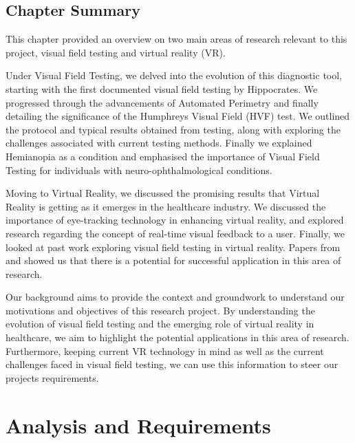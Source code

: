 \documentclass{l4proj}
\begin{document}
\section{Chapter Summary}
This chapter provided an overview on two main areas of research relevant to this project, visual field testing and virtual reality (VR).

Under Visual Field Testing, we delved into the evolution of this diagnostic tool, starting with the first documented visual field testing by Hippocrates. We progressed through the advancements of Automated Perimetry and finally detailing the significance of the Humphreys Visual Field (HVF) test. We outlined the protocol and typical results obtained from testing, along with exploring the challenges associated with current testing methods. Finally we explained Hemianopia as a condition and emphasised the importance of Visual Field Testing for individuals with neuro-ophthalmological conditions.

Moving to Virtual Reality, we discussed the promising results that Virtual Reality is getting as it emerges in the healthcare industry. We discussed the importance of eye-tracking technology in enhancing virtual reality, and explored research regarding the concept of real-time visual feedback to a user. Finally, we looked at past work exploring visual field testing in virtual reality. Papers from \citet{Stapelfeldt2021VRGlaucoma} and \cite{Wroblewski2014TestingVisualField} showed us that there is a potential for successful application in this area of research.

Our background aims to provide the context and groundwork to understand our motivations and objectives of this research project. By understanding the evolution of visual field testing and the emerging role of virtual reality in healthcare, we aim to highlight the potential applications in this area of research. Furthermore, keeping current VR technology in mind as well as the current challenges faced in visual field testing, we can use this information to steer our projects requirements.


\chapter{Analysis and Requirements}
\end{document}
